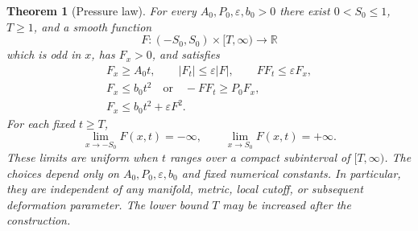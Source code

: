 \documentclass[11pt]{article}
\numberwithin{equation}{section}
\newtheorem{theorem}{Theorem}[section]
\theoremstyle{definition}
\theoremstyle{remark}
\begin{document}
\begin{theorem}[Pressure law]\label{pressure:law}
For every $A_0,P_0,\varepsilon,b_0>0$ there exist $0<S_0\le1$, $T\ge1$, and a
smooth function
\[
 F:(-S_0,S_0)\times[T,\infty)\longrightarrow\mathbb R
\]
which is odd in $x$, has $F_x>0$, and satisfies
\begin{equation}\label{pressure:estimates}
\begin{gathered}
 F_x\ge A_0t,\qquad |F_t|\le\varepsilon|F|,\qquad FF_t\le\varepsilon F_x,\\
 F_x\le b_0t^2\quad\text{or}\quad -FF_t\ge P_0F_x,\\
 F_x\le b_0t^2+\varepsilon F^2.
\end{gathered}
\end{equation}
For each fixed $t\ge T$,
\[
 \lim_{x\to-S_0}F(x,t)=-\infty,
 \qquad \lim_{x\to S_0}F(x,t)=+\infty.
\]
These limits are uniform when $t$ ranges over a compact subinterval of
$[T,\infty)$.  The choices depend only on $A_0,P_0,\varepsilon,b_0$ and fixed
numerical constants.  In particular, they are independent of any manifold,
metric, local cutoff, or subsequent deformation parameter.  The lower bound
$T$ may be increased after the construction.
\end{theorem}
\end{document}
